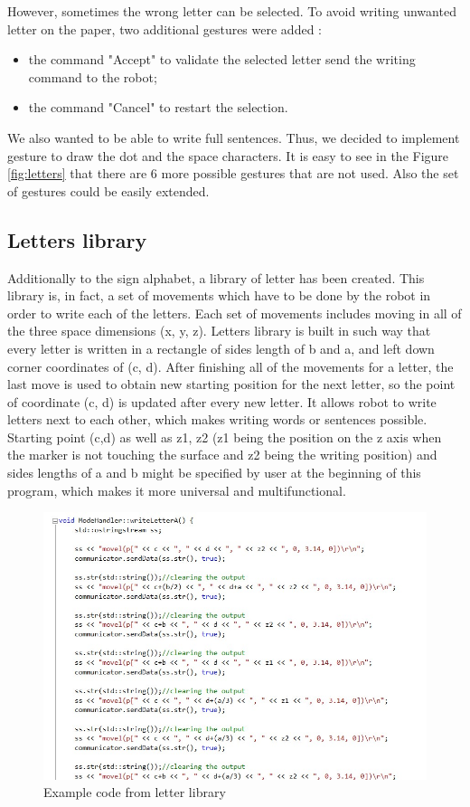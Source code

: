 However, sometimes the wrong letter can be selected. To avoid writing unwanted letter on the paper, two additional gestures were added :
\begin{itemize}
	\item the command "Accept" to validate the selected letter send the writing command to the robot;
	\item the command "Cancel" to restart the selection.
\end{itemize}

We also wanted to be able to write full sentences. Thus, we decided to implement gesture to draw the dot and the space characters. It is easy to see in the Figure \ref{fig:letters} that there are 6 more possible gestures that are not used. Also the set of gestures could be easily extended.

\subsection{Letters library}

Additionally to the sign alphabet, a library of letter has been created. This library is, in fact, a set of movements which have to be done by the robot in order to write each of the letters. Each set of movements includes moving in all of the three space dimensions (x, y, z). Letters library is built in such way that every letter is written in a rectangle of sides length of b and a, and left down corner coordinates of (c, d). After finishing all of the movements for a letter, the last move is used to obtain new starting position for the next letter, so the point of coordinate (c, d) is updated after every new letter. It allows robot to write letters next to each other, which makes writing words or sentences possible. Starting point (c,d) as well as z1, z2 (z1 being the position on the z axis when the marker is not touching the surface and z2 being the writing position) and sides lengths of a and b might be specified by user at the beginning of this program, which makes it more universal and multifunctional.\\

\begin{figure}[H]
	\includegraphics[scale=0.8]{Aletter}
	\centering
	\caption{Example code from letter library}
	\label{fig:Aletter}
\end{figure}

